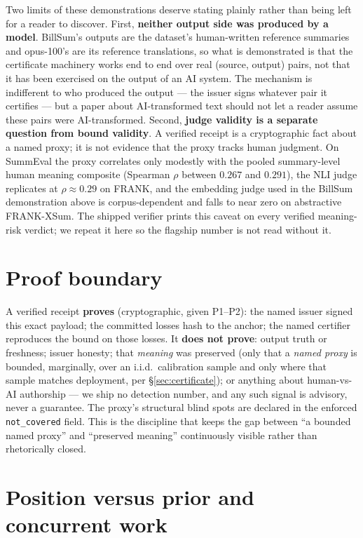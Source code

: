 \documentclass[11pt]{article}
\theoremstyle{definition}
\begin{document}
Two limits of these demonstrations deserve stating plainly rather than being
left for a reader to discover. First, \textbf{neither output side was produced
by a model}. BillSum's outputs are the dataset's human-written reference
summaries and opus-100's are its reference translations, so what is
demonstrated is that the certificate machinery works end to end over real
(source, output) pairs, not that it has been exercised on the output of an AI
system. The mechanism is indifferent to who produced the output --- the
issuer signs whatever pair it certifies --- but a paper about AI-transformed
text should not let a reader assume these pairs were AI-transformed.
Second, \textbf{judge validity is a separate question from bound validity}. A
verified receipt is a cryptographic fact about a named proxy; it is not
evidence that the proxy tracks human judgment. On SummEval the proxy
correlates only modestly with the pooled summary-level human meaning
composite (Spearman $\rho$ between $0.267$ and $0.291$), the NLI judge replicates at
$\rho \approx 0.29$ on FRANK, and the embedding judge used in the BillSum
demonstration above is corpus-dependent and falls to near zero on abstractive
FRANK-XSum. The shipped verifier prints this caveat on every verified
meaning-risk verdict; we repeat it here so the flagship number is not read
without it.

\section{Proof boundary}\label{sec:boundary}

A verified receipt \textbf{proves} (cryptographic, given P1--P2): the named
issuer signed this exact payload; the committed losses hash to the anchor;
the named certifier reproduces the bound on those losses. It \textbf{does
not prove}: output truth or freshness; issuer honesty; that \emph{meaning}
was preserved (only that a \emph{named proxy} is bounded, marginally, over an
i.i.d.\ calibration sample and only where that sample matches deployment, per
\S\ref{sec:certificate}); or anything about human-vs-AI authorship --- we ship no
detection number, and any such signal is advisory, never a guarantee. The
proxy's structural blind spots are declared in the enforced
\texttt{not\_covered} field. This is the discipline that keeps the gap
between ``a bounded named proxy'' and ``preserved meaning'' continuously
visible rather than rhetorically closed.

\section{Position versus prior and concurrent work}\label{sec:related}
\end{document}
